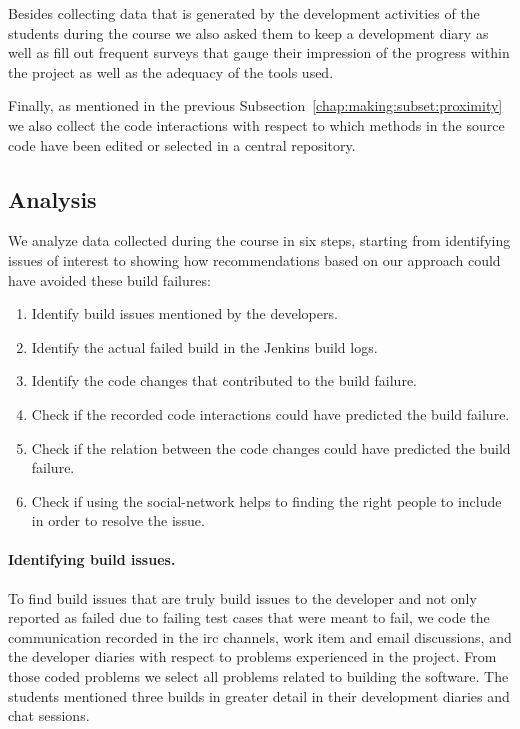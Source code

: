 Besides collecting data that is generated by the development activities of the students during the course we also asked them to keep a development diary as well as fill out frequent surveys that gauge their impression of the progress within the project as well as the adequacy of the tools used.

Finally, as mentioned in the previous Subsection~\ref{chap:making:subset:proximity} we also collect the code interactions with respect to which methods in the source code have been edited or selected in a central repository.

\subsection{Analysis}
\label{ch10:ana}
We analyze data collected during the course in six steps, starting from identifying issues of interest to showing how recommendations based on our approach could have avoided these build failures:

\begin{enumerate}
\item Identify build issues mentioned by the developers.
\item Identify the actual failed build in the Jenkins build logs.
\item Identify the code changes that contributed to the build failure.
\item Check if the recorded code interactions could have predicted the build failure.
\item Check if the relation between the code changes could have predicted the build failure.
\item Check if using the social-network helps to finding the right people to include in order to resolve the issue.
\end{enumerate}

\paragraph{Identifying build issues.}
To find build issues that are truly build issues to the developer and not only reported as failed due to failing test cases that were meant to fail, we code the communication recorded in the irc channels, work item and email discussions, and the developer diaries with respect to problems experienced in the project.
From those coded problems we select all problems related to building the software.
The students mentioned three builds in greater detail in their development diaries and chat sessions.

